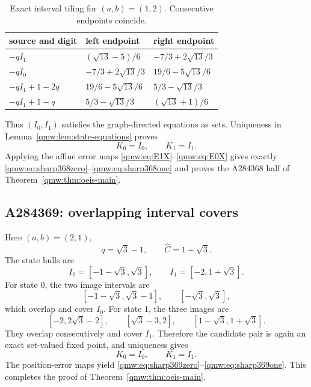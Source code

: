 \documentclass[11pt]{article}
\numberwithin{equation}{section}
\theoremstyle{definition}
\theoremstyle{remark}
\begin{document}
\begin{table}[ht]
\centering
\caption{Exact interval tiling for $(a,b)=(1,2)$.  Consecutive endpoints
coincide.}
\label{qmw:tab:tiling13}
\small
\begin{tabular}{@{}lll@{}}
\toprule
source and digit & left endpoint & right endpoint \\
\midrule
$-qI_1$ & $(\sqrt{13}-5)/6$ & $-7/3+2\sqrt{13}/3$ \\
$-qI_0$ & $-7/3+2\sqrt{13}/3$ & $19/6-5\sqrt{13}/6$ \\
$-qI_1+1-2q$ & $19/6-5\sqrt{13}/6$ & $5/3-\sqrt{13}/3$ \\
$-qI_1+1-q$ & $5/3-\sqrt{13}/3$ & $(\sqrt{13}+1)/6$ \\
\bottomrule
\end{tabular}
\end{table}

Thus $(I_0,I_1)$ satisfies the graph-directed equations as sets.  Uniqueness
in Lemma~\ref{qmw:lem:state-equations} proves
\begin{equation}\label{qmw:eq:Kinterval13}
K_0=I_0,
\qquad
K_1=I_1.
\end{equation}
Applying the affine error maps \eqref{qmw:eq:E1X}--\eqref{qmw:eq:E0X} gives exactly
\eqref{qmw:eq:sharp368zero}--\eqref{qmw:eq:sharp368one} and proves the A284368 half
of Theorem~\ref{qmw:thm:oeis-main}.

\subsection{A284369: overlapping interval covers}

Here $(a,b)=(2,1)$,
\begin{equation}\label{qmw:eq:q3C3}
q=\sqrt3-1,
\qquad
{\widehat C}=1+\sqrt3.
\end{equation}
The state hulls are
\begin{equation}\label{qmw:eq:I3}
I_0=[-1-\sqrt3,\sqrt3],
\qquad
I_1=[-2,1+\sqrt3].
\end{equation}
For state $0$, the two image intervals are
\begin{equation}\label{qmw:eq:zero-images3}
[-1-\sqrt3,\sqrt3-1],
\qquad
[-\sqrt3,\sqrt3],
\end{equation}
which overlap and cover $I_0$.  For state $1$, the three images are
\begin{equation}\label{qmw:eq:one-images3}
[-2,2\sqrt3-2],
\qquad
[\sqrt3-3,2],
\qquad
[1-\sqrt3,1+\sqrt3].
\end{equation}
They overlap consecutively and cover $I_1$.  Therefore the candidate pair is
again an exact set-valued fixed point, and uniqueness gives
\begin{equation}\label{qmw:eq:Kinterval3}
K_0=I_0,
\qquad
K_1=I_1.
\end{equation}
The position-error maps yield \eqref{qmw:eq:sharp369zero}--\eqref{qmw:eq:sharp369one}.
This completes the proof of Theorem~\ref{qmw:thm:oeis-main}.
\end{document}
